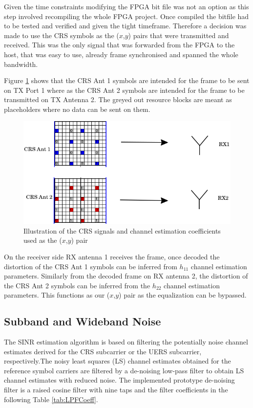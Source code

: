 Given the time constraints modifying the FPGA bit file was not an option as this step involved recompiling the whole FPGA project. Once compiled the bitfile had to be tested and verified and given the tight timeframe. Therefore a decision was made to use the CRS symbols as the ($x$,$y$) pairs that were transmitted and received. This was the only signal that was forwarded from the FPGA to the host, that was easy to use, already frame synchronised and spanned the whole bandwidth.

Figure \ref{fig:XYPairsCRS} shows that the CRS Ant 1 symbols are intended for the frame to be sent on TX Port 1 where as the CRS Ant 2 symbols are intended for the frame to be transmitted on TX Antenna 2. The greyed out resource blocks are meant as placeholders where no data can be sent on them.

\begin{figure}[!htb]
    \centering
    \includegraphics[width=\linewidth]{images/MultiAntennaCRSXYPairEdited.png}
    \caption{Illustration of the CRS signals and channel estimation coefficients used as the ($x$,$y$) pair}
    \label{fig:XYPairsCRS}
\end{figure}

On the receiver side RX antenna 1 receives the frame, once decoded the distortion of the CRS Ant 1 symbols can be inferred from $h_{11}$ channel estimation parameters. Similarly from the decoded frame on RX antenna 2, the distortion of the CRS Ant 2 symbols can be inferred from the $h_{22}$ channel estimation parameters. This functions as our ($x$,$y$) pair as the equalization can be bypassed.

\subsection{Subband and Wideband Noise}\label{ssec:SINR}

The SINR estimation algorithm is based on filtering the potentially noise channel estimates derived for the CRS subcarrier or the UERS subcarrier, respectively.The noisy least squares (LS) channel estimates obtained for the reference symbol carriers are filtered by a de-noising low-pass filter to obtain LS channel estimates with reduced noise. The implemented prototype de-noising filter is a raised cosine filter with nine taps and the filter coefficients in the following Table \ref{tab:LPFCoeff}.

